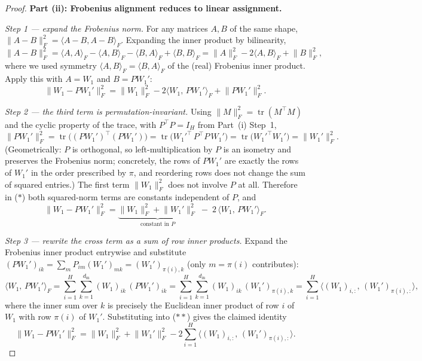 \documentclass[11pt]{article}
\theoremstyle{definition}
\theoremstyle{remark}
\begin{document}
\begin{proof}
\medskip
\noindent\textbf{Part (ii): Frobenius alignment reduces to linear assignment.}

\emph{Step 1 --- expand the Frobenius norm.}
For any matrices $A,B$ of the same shape, $\lVert A-B\rVert_F^2=\langle A-B,A-B\rangle_F$. Expanding
the inner product by bilinearity,
\[
\lVert A-B\rVert_F^2
=\langle A,A\rangle_F-\langle A,B\rangle_F-\langle B,A\rangle_F+\langle B,B\rangle_F
=\lVert A\rVert_F^2 - 2\langle A,B\rangle_F + \lVert B\rVert_F^2,
\]
where we used symmetry $\langle A,B\rangle_F=\langle B,A\rangle_F$ of the (real) Frobenius inner
product. Apply this with $A=W_1$ and $B=PW_1'$:
\[
\bigl\lVert W_1 - P W_1'\bigr\rVert_F^2
=\lVert W_1\rVert_F^2 - 2\bigl\langle W_1,\,P W_1'\bigr\rangle_F + \bigl\lVert P W_1'\bigr\rVert_F^2.
\tag{$\ast$}
\]

\emph{Step 2 --- the third term is permutation-invariant.}
Using $\lVert M\rVert_F^2=\operatorname{tr}(M^{\top}M)$ and the cyclic property of the trace, with
$P^{\top}P=I_H$ from Part~(i) Step~1,
\[
\bigl\lVert P W_1'\bigr\rVert_F^2
=\operatorname{tr}\!\bigl((PW_1')^{\top}(PW_1')\bigr)
=\operatorname{tr}\!\bigl(W_1'^{\top}\,P^{\top}P\,W_1'\bigr)
=\operatorname{tr}\!\bigl(W_1'^{\top}W_1'\bigr)
=\lVert W_1'\rVert_F^2 .
\]
(Geometrically: $P$ is orthogonal, so left-multiplication by $P$ is an isometry and preserves the
Frobenius norm; concretely, the rows of $PW_1'$ are exactly the rows of $W_1'$ in the order
prescribed by $\pi$, and reordering rows does not change the sum of squared entries.) The first term
$\lVert W_1\rVert_F^2$ does not involve $P$ at all. Therefore in ($\ast$) both squared-norm terms are
constants independent of $P$, and
\[
\bigl\lVert W_1 - P W_1'\bigr\rVert_F^2
=\underbrace{\lVert W_1\rVert_F^2 + \lVert W_1'\rVert_F^2}_{\text{constant in }P}
\;-\;2\,\bigl\langle W_1,\,P W_1'\bigr\rangle_F .
\tag{$\ast\ast$}
\]

\emph{Step 3 --- rewrite the cross term as a sum of row inner products.}
Expand the Frobenius inner product entrywise and substitute $(P W_1')_{ik}=\sum_m P_{im}(W_1')_{mk}
=(W_1')_{\pi(i),k}$ (only $m=\pi(i)$ contributes):
\[
\bigl\langle W_1,\,P W_1'\bigr\rangle_F
=\sum_{i=1}^{H}\sum_{k=1}^{d_{\mathrm{in}}} (W_1)_{ik}\,(PW_1')_{ik}
=\sum_{i=1}^{H}\sum_{k=1}^{d_{\mathrm{in}}} (W_1)_{ik}\,(W_1')_{\pi(i),k}
=\sum_{i=1}^{H}\bigl\langle (W_1)_{i,:},\,(W_1')_{\pi(i),:}\bigr\rangle ,
\]
where the inner sum over $k$ is precisely the Euclidean inner product of row $i$ of $W_1$ with row
$\pi(i)$ of $W_1'$. Substituting into ($\ast\ast$) gives the claimed identity
\[
\bigl\lVert W_1 - P W_1'\bigr\rVert_F^2
=\lVert W_1\rVert_F^2 + \lVert W_1'\rVert_F^2
-2\sum_{i=1}^{H}\bigl\langle (W_1)_{i,:},\,(W_1')_{\pi(i),:}\bigr\rangle .
\]


\end{proof}
\end{document}
